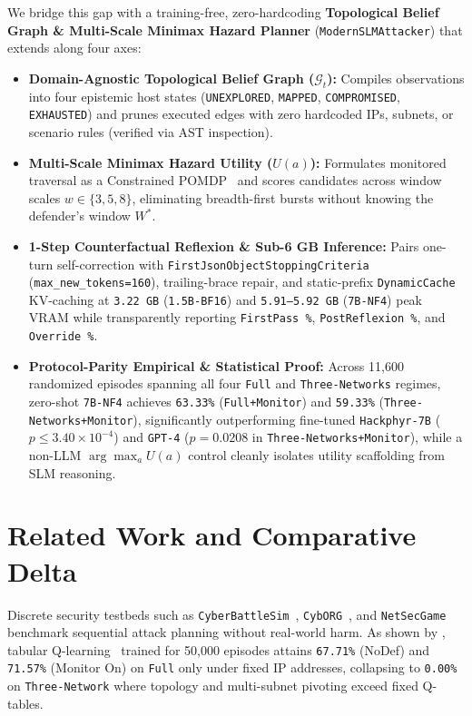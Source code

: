 \documentclass[a4paper,fleqn]{cas-dc}
\begin{document}
We bridge this gap with a training-free, zero-hardcoding \textbf{Topological Belief Graph \& Multi-Scale Minimax Hazard Planner} (\texttt{ModernSLMAttacker}) that extends \citet{rigaki2026building} along four axes:
\begin{itemize}
    \item \textbf{Domain-Agnostic Topological Belief Graph ($\mathcal{G}_t$):} Compiles observations into four epistemic host states (\texttt{UNEXPLORED}, \texttt{MAPPED}, \texttt{COMPROMISED}, \texttt{EXHAUSTED}) and prunes executed edges with zero hardcoded IPs, subnets, or scenario rules (verified via AST inspection).
    \item \textbf{Multi-Scale Minimax Hazard Utility ($U(a)$):} Formulates monitored traversal as a Constrained POMDP~\citep{altman1999cmdp} and scores candidates across window scales $w \in \{3, 5, 8\}$, eliminating breadth-first bursts without knowing the defender's window $W^*$.
    \item \textbf{1-Step Counterfactual Reflexion \& Sub-6 GB Inference:} Pairs one-turn self-correction with \texttt{FirstJsonObjectStoppingCriteria} (\texttt{max\_new\_tokens=160}), trailing-brace repair, and static-prefix \texttt{DynamicCache} KV-caching at \texttt{3.22 GB} (\texttt{1.5B-BF16}) and \texttt{5.91--5.92 GB} (\texttt{7B-NF4}) peak VRAM while transparently reporting \texttt{FirstPass \%}, \texttt{PostReflexion \%}, and \texttt{Override \%}.
    \item \textbf{Protocol-Parity Empirical \& Statistical Proof:} Across 11,600 randomized episodes spanning all four \texttt{Full} and \texttt{Three-Networks} regimes, zero-shot \texttt{7B-NF4} achieves \texttt{63.33\%} (\texttt{Full+Monitor}) and \texttt{59.33\%} (\texttt{Three-Networks+Monitor}), significantly outperforming fine-tuned \texttt{Hackphyr-7B} ($p \le 3.40 \times 10^{-4}$) and \texttt{GPT-4} ($p = 0.0208$ in \texttt{Three-Networks+Monitor}), while a non-LLM $\arg\max_a U(a)$ control cleanly isolates utility scaffolding from SLM reasoning.
\end{itemize}

\section{Related Work and Comparative Delta}
\label{sec:related_work}

Discrete security testbeds such as \texttt{CyberBattleSim}~\citep{microsoft2021cyberbattlesim}, \texttt{CybORG}~\citep{standenc2021cyborg}, and \texttt{NetSecGame}~\citep{garcia2023netsecgame,maria2024netsecgame} benchmark sequential attack planning without real-world harm. As shown by \citet{rigaki2026building}, tabular Q-learning~\citep{watkins1992qlearning} trained for 50,000 episodes attains \texttt{67.71\%} (NoDef) and \texttt{71.57\%} (Monitor On) on \texttt{Full} only under fixed IP addresses, collapsing to \texttt{0.00\%} on \texttt{Three-Network} where topology and multi-subnet pivoting exceed fixed Q-tables.
\end{document}
